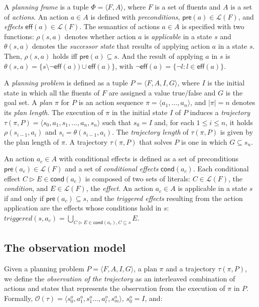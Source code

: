 \documentclass[letterpaper]{article} %
\newcommand{\tup}[1]{{\langle #1 \rangle}}
\newcommand{\pre}{\mathsf{pre}}     %
\newcommand{\eff}{\mathsf{eff}}     %
\newcommand{\cond}{\mathsf{cond}}   %
\begin{document}
A {\em planning frame} is a tuple $\Phi=\tup{F,A}$, where $F$ is a set of fluents and $A$ is a set of \emph{actions}. An action $a\in A$ is defined with {\em preconditions}, $\pre(a)\in\mathcal{L}(F)$,  and {\em effects} $\eff(a)\in\mathcal{L}(F)$. The semantics of actions $a\in A$ is specified with two functions: $\rho(s,a)$ denotes whether action $a$ is {\em applicable} in a state $s$ and $\theta(s,a)$ denotes the {\em successor state} that results of applying action $a$ in a state $s$. Then, $\rho(s,a)$ holds iff $\pre(a)\subseteq s$. And the result of applying $a$ in $s$ is $\theta(s,a)=\{s\setminus\neg\eff(a))\cup\eff(a)\}$, with $\neg\eff(a) = \{\neg l : l \in \eff(a)\}$.

A {\em planning problem} is defined as a tuple $P=\tup{F,A,I,G}$, where $I$ is the initial state in which all the fluents of $F$ are assigned a value true/false and $G$ is the goal set. A {\em plan} $\pi$ for $P$ is an action sequence $\pi=\tup{a_1, \ldots, a_n}$, and $|\pi|=n$ denotes its {\em plan length}. The execution of $\pi$ in the initial state $I$ of $P$ induces a {\em trajectory} $\tau(\pi,P)=\tup{s_0, a_1, s_1, \ldots, a_n, s_n}$ such that $s_0=I$ and, for each {\small $1\leq i\leq n$}, it holds $\rho(s_{i-1},a_i)$ and $s_i=\theta(s_{i-1},a_i)$. The {\em trajectory length} of $\tau(\pi,P)$ is given by the plan length of $\pi$. A trajectory $\tau(\pi,P)$ that solves $P$ is one in which $G \subseteq s_n$.


An action $a_c\in A$ with conditional effects is defined as a set of preconditions $\pre(a_c)\in\mathcal{L}(F)$ and a set of {\em conditional effects} $\cond(a_c)$. Each conditional effect $C\rhd E\in\cond(a_c)$ is composed of two sets of literals: $C\in\mathcal{L}(F)$, the {\em condition}, and $E\in\mathcal{L}(F)$, the {\em effect}. An action $a_c\in A$ is applicable in a state $s$ if and only if $\pre(a_c)\subseteq s$, and the {\em triggered effects} resulting from the action application are the effects whose conditions hold in $s$: $triggered(s,a_c)=\bigcup_{C\rhd E\in\cond(a_c),C\subseteq s} E$.


\subsection{The observation model}
Given a planning problem $P=\tup{F,A,I,G}$, a plan $\pi$ and a trajectory $\tau(\pi,P)$, we define the \emph{observation of the trajectory} as an interleaved combination of actions and states that represents the observation from the execution of $\pi$ in $P$. Formally, $\mathcal{O}(\tau)=\tup{s_0^o,a_1^o,s_1^o \ldots , a_l^o, s_m^o}$, $s_0^o=I$, and:
\end{document}
